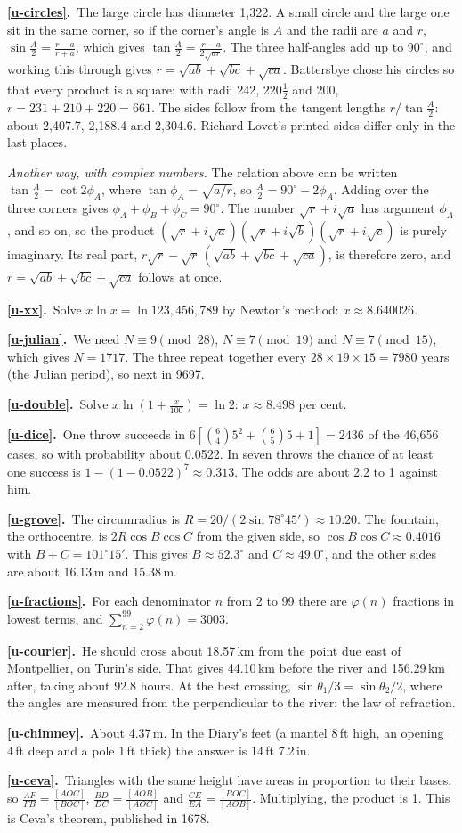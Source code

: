 \documentclass[11pt,a4paper]{article}
\newcounter{prob}
\newcommand{\ans}[2]{\par\smallskip\noindent\textbf{\ref{#1}.}\ #2}
\begin{document}
\ans{u-circles}{The large circle has diameter 1,322. A small circle and the large one sit in the
same corner, so if the corner's angle is $A$ and the radii are $a$ and $r$,
$\sin\tfrac A2 = \tfrac{r-a}{r+a}$, which gives $\tan\tfrac A2 = \tfrac{r-a}{2\sqrt{ar}}$. The three
half-angles add up to $90^\circ$, and working this through gives
$r = \sqrt{ab} + \sqrt{bc} + \sqrt{ca}$. Battersbye chose his circles so that every product
is a square: with radii 242, $220\tfrac12$ and 200, $r = 231 + 210 + 220 = 661$. The sides
follow from the tangent lengths $r/\tan\tfrac A2$: about 2,407.7, 2,188.4 and 2,304.6.
Richard Lovet's printed sides differ only in the last places.

\emph{Another way, with complex numbers.} The relation above can be written
$\tan\tfrac A2 = \cot 2\phi_A$, where $\tan\phi_A = \sqrt{a/r}$, so $\tfrac A2 = 90^\circ - 2\phi_A$.
Adding over the three corners gives $\phi_A + \phi_B + \phi_C = 90^\circ$. The number
$\sqrt r + i\sqrt a$ has argument $\phi_A$, and so on, so the product
$(\sqrt r + i\sqrt a)(\sqrt r + i\sqrt b)(\sqrt r + i\sqrt c)$ is purely imaginary. Its real
part, $r\sqrt r - \sqrt r\,(\sqrt{ab} + \sqrt{bc} + \sqrt{ca})$, is therefore zero, and
$r = \sqrt{ab} + \sqrt{bc} + \sqrt{ca}$ follows at once.}

\ans{u-xx}{Solve $x\ln x = \ln123{,}456{,}789$ by Newton's method: $x \approx 8.640026$.}
\ans{u-julian}{We need $N \equiv 9 \pmod{28}$, $N \equiv 7 \pmod{19}$ and $N \equiv 7
\pmod{15}$, which gives $N = 1717$. The three repeat together every $28\times19\times15 =
7980$ years (the Julian period), so next in 9697.}
\ans{u-double}{Solve $x\ln\!\left(1+\tfrac{x}{100}\right) = \ln2$: $x \approx 8.498$ per
cent.}
\ans{u-dice}{One throw succeeds in $6\left[\binom64 5^2+\binom65 5+1\right] = 2436$ of
the 46,656 cases, so with probability about 0.0522. In seven throws the chance of at
least one success is $1-(1-0.0522)^7 \approx 0.313$. The odds are about 2.2 to 1 against
him.}
\ans{u-grove}{The circumradius is $R = 20/(2\sin78^\circ45') \approx 10.20$. The
fountain, the orthocentre, is $2R\cos B\cos C$ from the given side, so
$\cos B\cos C \approx 0.4016$ with $B + C = 101^\circ15'$. This gives $B \approx 52.3^\circ$
and $C \approx 49.0^\circ$, and the other sides are about 16.13\,m and 15.38\,m.}
\ans{u-fractions}{For each denominator $n$ from 2 to 99 there are $\varphi(n)$ fractions in
lowest terms, and $\sum_{n=2}^{99}\varphi(n) = 3003$.}
\ans{u-courier}{He should cross about 18.57\,km from the point due east of Montpellier,
on Turin's side. That gives 44.10\,km before the river and 156.29\,km after, taking about
92.8 hours. At the best crossing, $\sin\theta_1/3 = \sin\theta_2/2$, where the angles are
measured from the perpendicular to the river: the law of refraction.}
\ans{u-chimney}{About 4.37\,m. In the Diary's feet (a mantel 8\,ft high, an opening 4\,ft
deep and a pole 1\,ft thick) the answer is 14\,ft 7.2\,in.}
\ans{u-ceva}{Triangles with the same height have areas in proportion to their bases, so
$\tfrac{AF}{FB} = \tfrac{[AOC]}{[BOC]}$, $\tfrac{BD}{DC} = \tfrac{[AOB]}{[AOC]}$ and
$\tfrac{CE}{EA} = \tfrac{[BOC]}{[AOB]}$. Multiplying, the product is 1. This is Ceva's
theorem, published in 1678.}
\end{document}
